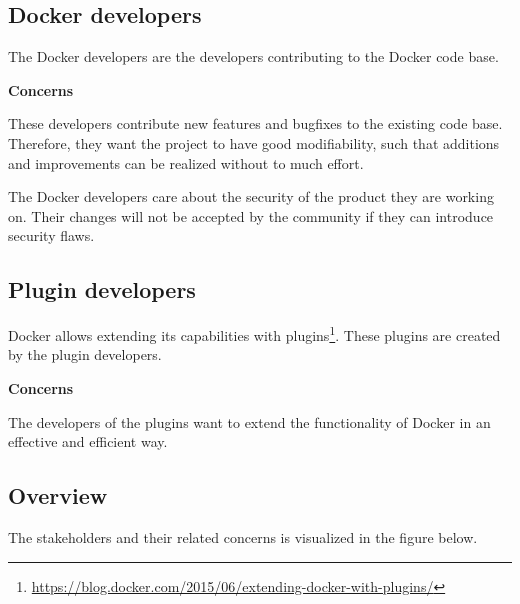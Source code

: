 \subsection*{Docker developers}
The Docker developers are the developers contributing to the Docker code base.

\textbf{Concerns}
\begin{description}[labelindent=25pt,style=multiline,leftmargin=4.0cm,font=\normalfont\itshape]

\item[\textbf{Maintainability}] These developers contribute new features and bugfixes to the existing code base. Therefore, they want the project to have good modifiability, such that additions and improvements can be realized without to much effort.


\item[\textbf{Security}] The Docker developers care about the security of the product they are working on. Their changes will not be accepted by the community if they can introduce security flaws.  %

\end{description}

\subsection*{Plugin developers}
Docker allows extending its capabilities with plugins\footnote{\url{https://blog.docker.com/2015/06/extending-docker-with-plugins/}}. These plugins are created by the plugin developers.

\textbf{Concerns}
\begin{description}[labelindent=25pt,style=multiline,leftmargin=4.0cm,font=\normalfont\itshape]

\item[\textbf{Portability}: (Adaptability)] The developers of the plugins want to extend the functionality of Docker in an effective and efficient way. 

\end{description}

\subsection*{Overview}
The stakeholders and their related concerns is visualized in the figure below.

